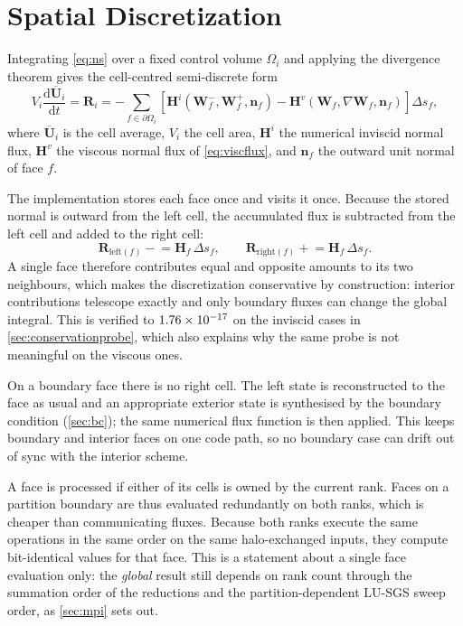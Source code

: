 \section{Spatial Discretization}
\label{sec:spatial}

Integrating \cref{eq:ns} over a fixed control volume $\Omega_i$ and applying the
divergence theorem gives the cell-centred semi-discrete form
\begin{equation}
  V_i\frac{\mathrm{d}\overline{\mathbf{U}}_i}{\mathrm{d}t}
  = \mathbf{R}_i
  = -\sum_{f\in\partial\Omega_i}
     \left[\mathbf{H}^i(\mathbf{W}^-_f,\mathbf{W}^+_f,\mathbf{n}_f)
          -\mathbf{H}^v(\mathbf{W}_f,\nabla\mathbf{W}_f,\mathbf{n}_f)\right]\Delta s_f,
  \label{eq:fv}
\end{equation}
where $\overline{\mathbf{U}}_i$ is the cell average, $V_i$ the cell area,
$\mathbf{H}^i$ the numerical inviscid normal flux, $\mathbf{H}^v$ the viscous
normal flux of \cref{eq:viscflux}, and $\mathbf{n}_f$ the outward unit normal of
face $f$.

The implementation stores each face once and visits it once. Because the stored
normal is outward from the left cell, the accumulated flux is subtracted from the
left cell and added to the right cell:
\begin{equation}
  \mathbf{R}_{\mathrm{left}(f)} \mathrel{-}= \mathbf{H}_f\,\Delta s_f,
  \qquad
  \mathbf{R}_{\mathrm{right}(f)} \mathrel{+}= \mathbf{H}_f\,\Delta s_f .
  \label{eq:scatter}
\end{equation}
A single face therefore contributes equal and opposite amounts to its two
neighbours, which makes the discretization conservative by construction: interior
contributions telescope exactly and only boundary fluxes can change the global
integral. This is verified to $\num{1.76e-17}$ on the inviscid cases in
\cref{sec:conservationprobe}, which also explains why the same probe is not meaningful on
the viscous ones.

On a boundary face there is no right cell. The left state is reconstructed to the
face as usual and an appropriate exterior state is synthesised by the boundary
condition (\cref{sec:bc}); the same numerical flux function is then applied. This
keeps boundary and interior faces on one code path, so no boundary case can drift
out of sync with the interior scheme.

A face is processed if either of its cells is owned by the current rank. Faces on
a partition boundary are thus evaluated redundantly on both ranks, which is
cheaper than communicating fluxes. Because both ranks execute the same operations in
the same order on the same halo-exchanged inputs, they compute bit-identical values for
that face. This is a statement about a single face evaluation only: the \emph{global}
result still depends on rank count through the summation order of the reductions and
the partition-dependent LU-SGS sweep order, as \cref{sec:mpi} sets out.

